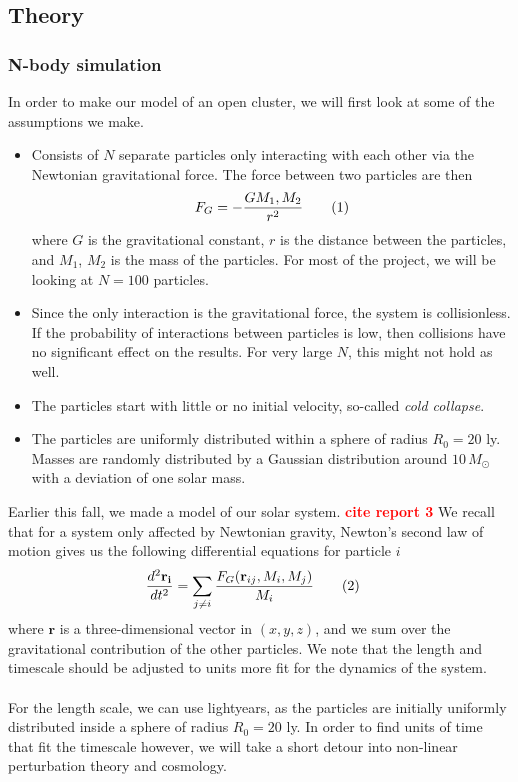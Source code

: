 \documentclass{article}
\newcommand\red[1]{\textcolor{red}{\textbf{#1}}}
\newcommand\numberthis{\addtocounter{equation}{1}\tag{\theequation}}
\begin{document}
\subsection{Theory}

\subsubsection{N-body simulation}
In order to make our model of an open cluster, we will first look at some of the assumptions we make.
\begin{itemize}
  \item Consists of $N$ separate particles only interacting with each other via the Newtonian gravitational force. The force between two particles are then
    \begin{align*}
      F_G = -\frac{G M_1, M_2}{r^2}\numberthis\label{eq:newton}
    \end{align*}
    where $G$ is the gravitational constant, $r$ is the distance between the particles, and $M_1$, $M_2$ is the mass of the particles. For most of the project, we will be looking at $N=100$ particles.
  \item Since the only interaction is the gravitational force, the system is collisionless. If the probability of interactions between particles is low, then collisions have no significant effect on the results. For very large $N$, this might not hold as well.
  \item The particles start with little or no initial velocity, so-called \textit{cold collapse}.
  \item The particles are uniformly distributed within a sphere of radius $R_0 = 20$ ly. Masses are randomly distributed by a Gaussian distribution around $10\,M_{\odot}$ with a deviation of one solar mass.
\end{itemize}
Earlier this fall, we made a model of our solar system. \red{cite report 3} We recall that for a system only affected by Newtonian gravity, Newton's second law of motion gives us the following differential equations for particle $i$
\begin{align*}
  \frac{d^2\mathbf{r_i}}{dt^2} &= \sum\limits_{j\neq i}\frac{F_G(\mathbf{r}_{ij}, M_i,M_j)}{M_i}\numberthis\label{eq:diff_eq}
\end{align*}
where $\mathbf{r}$ is a three-dimensional vector in $(x,y,z)$, and we sum over the gravitational contribution of the other particles. We note that the length and timescale should be adjusted to units more fit for the dynamics of the system.\\\\
For the length scale, we can use lightyears, as the particles are initially uniformly distributed inside a sphere of radius $R_0 = 20$ ly. In order to find units of time that fit the timescale however, we will take a short detour into non-linear perturbation theory and cosmology.
\end{document}
